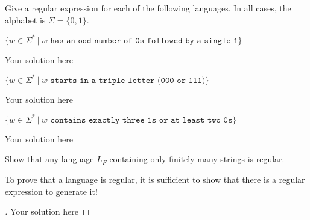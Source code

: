 \documentclass[12pt]{article}
\newenvironment{exercise}[2][Exercise]{\begin{trivlist}
\item[\hskip \labelsep {\bfseries #1}\hskip \labelsep {\bfseries #2.}]}{\end{trivlist}}
\newenvironment{solution}[1][{\color{red} Solution:}]{\begin{trivlist}
\item[\hskip \labelsep {\bfseries #1}\hskip \labelsep {\bfseries}]}{\end{trivlist}}
\begin{document}
\begin{exercise}{2}

Give a regular expression for each of the following languages. In all cases, the alphabet is $\Sigma = \{0,1\}$.
\begin{enumerate}[(a)]
	\item $\{ w \in \Sigma^* \ | \ w \texttt{ has an odd number of 0s followed by a single 1}\}$
	\begin{solution}
		Your solution here
	\end{solution}
	
	\item $\{w \in \Sigma^* \ | \ w \texttt{ starts in a triple letter (000 or 111)}\}$
	\begin{solution}
		Your solution here
	\end{solution}
	
	\item $\{w \in \Sigma^* \ | \ w \texttt{ contains exactly three 1s or at least two 0s}\}$
	\begin{solution}
		Your solution here
	\end{solution}
	
\end{enumerate}

\end{exercise}

\clearpage
\begin{exercise}{3}
Show that any language $L_F$ containing only finitely many strings is regular.
\end{exercise}

\begin{tip}
To prove that a language is regular, it is sufficient to show that there is a regular expression to generate it!
\end{tip}


\begin{solution}

\begin{proof}[\unskip\nopunct]
	Your solution here
\end{proof}

\end{solution}
\end{document}
